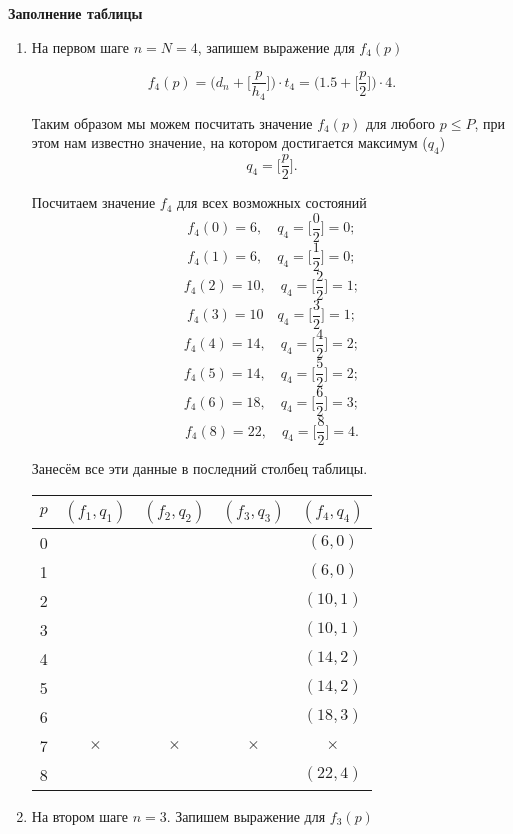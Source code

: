 \textbf{Заполнение таблицы}
\begin{enumerate}[nosep]
	\item[\fbox{Шаг 1}] На первом шаге $n = N = 4$, запишем выражение для $f_4(p)$
	
	\[
	f_4(p) = \bigg(d_n + \bigg[\frac{p}{h_4}\bigg]\bigg) \cdot t_4 = \bigg(1.5 + \bigg[\frac{p}{2}\bigg]\bigg) \cdot 4.
	\]
	
	Таким образом мы можем посчитать значение $f_4(p)$ для любого $p \le P$, при этом нам известно значение, на котором достигается максимум ($q_4$)
	\[
	q_4 = \bigg[\frac{p}{2}\bigg].
	\]
	
	
	Посчитаем значение $f_4$ для всех возможных состояний
	\[
	f_4(0) = 6, \quad q_4 = \bigg[\frac{0}{2}\bigg] = 0;
	\]
	\[
	f_4(1) = 6, \quad q_4 = \bigg[\frac{1}{2}\bigg] = 0;
	\]
	\[
	f_4(2) = 10, \quad q_4 = \bigg[\frac{2}{2}\bigg] = 1;
	\]
	\[
	f_4(3) = 10 \quad q_4 = \bigg[\frac{3}{2}\bigg] = 1;
	\]
	\[
	f_4(4) = 14, \quad q_4 = \bigg[\frac{4}{2}\bigg] = 2;
	\]
	\[
	f_4(5) = 14, \quad q_4 = \bigg[\frac{5}{2}\bigg] = 2;
	\]
	\[
	f_4(6) = 18, \quad q_4 = \bigg[\frac{6}{2}\bigg] = 3;
	\]
	\[
	f_4(8) = 22, \quad q_4 = \bigg[\frac{8}{2}\bigg] = 4.
	\]
	
	Занесём все эти данные в последний столбец таблицы.
	
	\begin{table}[H]
		\centering
		\begin{tabular}{ | c | c | c | c | c | } 
			\hline
			$p$ & $(f_1, q_1)$ & $(f_2, q_2)$ & $(f_3, q_3)$ & $(f_4, q_4)$ \\ 
			\hline
			0 & & & & $(6, 0)$ \\\hline
			1 & & & & $(6, 0)$ \\\hline
			2 & & & & $(10, 1)$ \\\hline
			3 & & & & $(10, 1)$ \\\hline
			4 & & & & $(14, 2)$ \\\hline
			5 & & & & $(14, 2)$ \\\hline
			6 & & & & $(18, 3)$ \\\hline
			7 & $\times$ & $\times$   & $\times$ & $\times$ \\\hline
			8 & & & & $(22, 4)$ \\\hline
		\end{tabular}
	\end{table}
	
	\item[\fbox{Шаг 2}] На втором шаге $n = 3$. Запишем выражение для $f_3(p)$
	

\end{enumerate}
